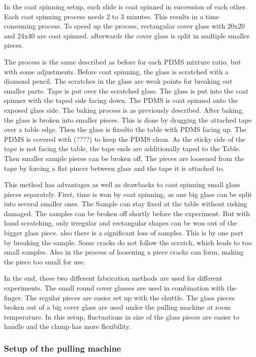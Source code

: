 In the coat spinning setup, each slide is coat spinned in succession of each other. Each coat spinning process needs 2 to 3 minutes. This results in a time consuming process. To speed up the process, rectangular cover glass with 20x20 and 24x40 are coat spinned. afterwards the cover glass is split in multiple smaller pieces. 

The process is the same described as before for each PDMS mixture ratio, but with some adjustments. Before coat spinning, the glass is scratched with a diamond pencil. The scratches in the glass are weak points for breaking out smaller parts. Tape is put over the scratched glass. The glass is put into the coat spinner with the taped side facing down. The PDMS is coat spinned onto the exposed glass side. The baking process is as previously described. After baking, the glass is broken into smaller pieces. This is done by dragging the attached tape over a table edge. Then the glass is fixedto the table with PDMS facing up. The PDMS is covered with (????) to keep the PDMS clean. As the sticky side of the tape is not facing the table, the tape ends are additionally taped to the Table. Then smaller sample pieces can be broken off, The pieces are loosened from the tape by forcing a flat pincer between glass and the tape it is attached to.

This method has advantages as well as drawbacks to coat spinning small glass pieces separately. First, time is won by coat spinning, as one big glass can be split into several smaller ones. The Sample can stay fixed at the table without risking damaged. The samples can be broken off shortly before the experiment. But with hand scratching, only irregular and rectangular shapes can be won out of the bigger glass piece. also there is a significant loss of samples. This is by one part by breaking the sample. Some cracks do not follow the scratch, which leads to too small samples. Also in the process of loosening a piece cracks can form, making the piece too small for use.

In the end, these two different fabrication methods are used for different experiments. The small round cover glasses are used in combination with the finger. The regular pieces are easier set up with the shuttle. The glass pieces broken out of a big cover glass are used under the pulling machine at room temperature. In this setup, fluctuations in size of the glass pieces are easier to handle and the clamp has more flexibility.

\subsubsection{Setup of the pulling machine}

